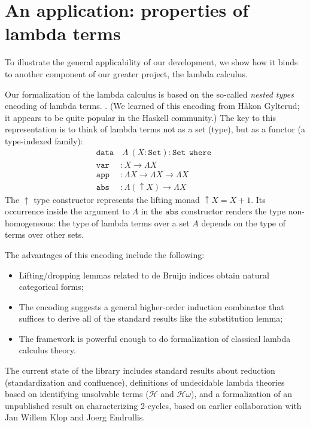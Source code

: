 \section{An application: properties of lambda terms} \label{sec:Applications}
To illustrate the general applicability of our development, we show how it binds to another component of our greater project, the lambda calculus.

Our formalization of the lambda calculus is based on the so-called \emph{nested types} encoding of lambda terms.
\cite{BirdPaterson} \cite{AltenkirchReus}.
(We learned of this encoding from H\aa{}kon Gylterud; it appears to be quite popular in the Haskell community.)
The key to this representation is to think of lambda terms not as a set (type), but as a functor (a type-indexed family): 
\newcommand{\Lam}{\Lambda}
\newcommand{\tSet}{\mathtt{Set}}
\newcommand{\mtt}[1]{\mathtt{#1}}
\begin{align*}
  \mtt{data}&\ \Lam\ (X : \tSet) : \tSet \ \ \mtt{where} \ \ \\ 
  \mtt{var} &: X → \Lam X \\
  \mtt{app} &: \Lam X → \Lam X → \Lam X \\
  \mtt{abs} &: \Lam (\uparrow\! X) → \Lam X
\end{align*}
The $\uparrow$ type constructor represents the lifting monad $\uparrow X = X + 1$. 
Its occurrence inside the argument to $\Lam$ in the $\mtt{abs}$ constructor renders the type non-homogeneous: the type of lambda terms over a set $A$ 
depends on the type of terms over other sets.

The advantages of this encoding include the following:
\begin{itemize}
  \item Lifting/dropping lemmas related to de Bruijn indices obtain natural categorical forms;
  \item The encoding suggests a general higher-order induction combinator that suffices to derive all of the standard results like the substitution lemma;
  \item The framework is powerful enough to do formalization of classical lambda calculus theory.
\end{itemize}
\newcommand{\mcH}{\mathcal{H}}
\newcommand{\mcHo}{\mathcal{H\omega}}
The current state of the library includes standard results about reduction (standardization and confluence), 
definitions of undecidable lambda theories based on identifying unsolvable terms ($\mcH$ and $\mcHo$), 
and a formalization of an unpublished result on characterizing 2-cycles, based on earlier collaboration with Jan Willem Klop and Joerg Endrullis.

